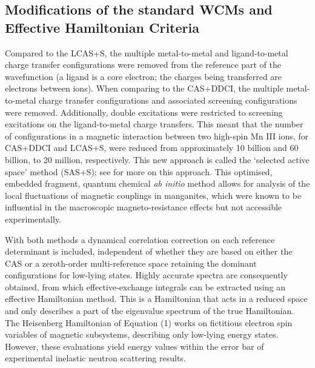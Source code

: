 \documentclass[10pt]{article}
\begin{document}
\subsection{Modifications of the standard WCMs and Effective Hamiltonian Criteria}

Compared to the LCAS+S, the multiple metal-to-metal and ligand-to-metal charge transfer configurations were removed from the reference part of the wavefunction (a ligand is a core electron; the charges being transferred are electrons between ions). When comparing to the CAS+DDCI, the multiple metal-to-metal charge transfer configurations and associated screening configurations were removed. Additionally, double excitations were restricted to screening excitations on the ligand-to-metal charge transfers. This meant that the number of configurations in a magnetic interaction between two high-spin Mn III ions, for CAS+DDCI and LCAS+S, were reduced from approximately 10 billion and 60 billion, to 20 million, respectively. This new approach is called the `selected active space' method (SAS+S); see \cite{gelle2009accurate} for more on this approach. This optimised, embedded fragment, quantum chemical {\it ab initio} method allows for analysis of the local fluctuations of magnetic couplings in manganites, which were known to be influential in the macroscopic magneto-resistance effects but not accessible experimentally.


With both methods a dynamical correlation correction on each reference determinant is included, independent of whether they are based on either the CAS or a zeroth-order multi-reference space retaining the dominant configurations for low-lying states. Highly accurate spectra are consequently obtained, from which effective-exchange integrals can be extracted using an effective Hamiltonian method. This is a Hamiltonian that acts in a reduced space and only describes a part of the eigenvalue spectrum of the true Hamiltonian. The Heisenberg Hamiltonian of Equation (1) works on fictitious electron spin variables of magnetic subsystems, describing only low-lying energy states. However, these evaluations yield energy values within the error bar of experimental inelastic neutron scattering results.
\end{document}
